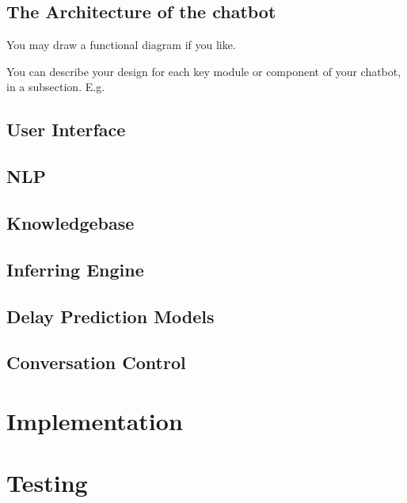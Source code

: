 \documentclass[11pt]{cmpreport}
\begin{document}
 
\subsection{The Architecture of the chatbot}
You may draw a functional diagram if you like.  

You can describe your design for each key module or component of your chatbot, in a subsection. E.g. 
\subsection{User Interface} 

\subsection{NLP}

\subsection{Knowledgebase}

\subsection{Inferring Engine}

\subsection{Delay Prediction Models}

\subsection{Conversation Control}

%

\section{Implementation}

\section{Testing}
\end{document}
